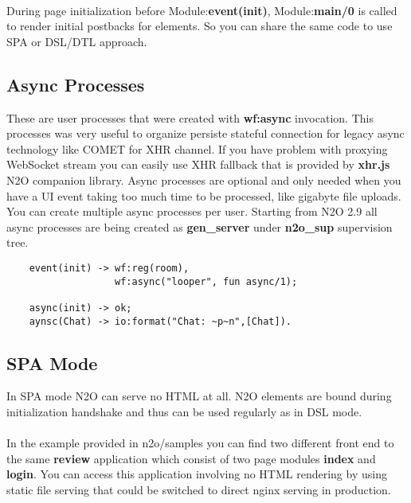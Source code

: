 \paragraph{}
During page initialization before Module:{\bf event(init)},
Module:{\bf main/0} is called to render initial postbacks for
elements. So you can share the same code to use SPA or DSL/DTL approach.

\subsection{Async Processes}
These are user processes that were created with {\bf wf:async} invocation.
This processes was very useful to organize persiste stateful connection
for legacy async technology like COMET for XHR channel. If you have problem with
proxying WebSocket stream you can easily use XHR fallback that is
provided by {\bf xhr.js} N2O companion library.
Async processes are optional and only needed when you have a UI event taking too much
time to be processed, like gigabyte file uploads. You can create
multiple async processes per user. Starting from N2O 2.9 all async
processes are being created as {\bf gen\_server} under
{\bf n2o\_sup} supervision tree.

\vspace{1\baselineskip}
\begin{lstlisting}
    event(init) -> wf:reg(room),
                   wf:async("looper", fun async/1);

    async(init) -> ok;
    aynsc(Chat) -> io:format("Chat: ~p~n",[Chat]).
\end{lstlisting}
\vspace{1\baselineskip}

\newpage
\subsection{SPA Mode}
In SPA mode N2O can serve no HTML at all. N2O elements are
bound during initialization handshake and thus can be used
regularly as in DSL mode.

\paragraph{}
In the example provided in n2o/samples you can find two different
front end to the same {\bf review} application which consist of
two page modules {\bf index} and {\bf login}. You can access this application
involving no HTML rendering by using static file serving that could be
switched to direct nginx serving in production.

